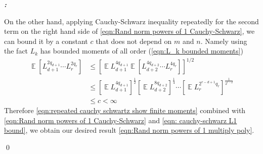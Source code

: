 \documentclass[12pt]{extarticle}
\renewenvironment{proof}[1][\proofname]{ { \it\bfseries #1: }}{\qed}
\newcommand{\1}{\field{1}}
\DeclareMathOperator{\E}{\mathbb{E}}
\numberwithin{equation}{section}
\begin{document}
\begin{proof}
\begin{enumerate}[label={(\arabic*)}]
On the other hand, applying Cauchy-Schwarz inequality repeatedly for the second term on the right hand side of \cref{eqn:Rand norm powers of 1 Cauchy-Schwarz}, we can bound it by a constant $c$ that does not depend on $m$ and $n$. Namely using the fact $L_k$ has bounded moments of all order (\cref{eqn:L_k bounded moments})
\begin{align}
    \E [L_{d+1}^{2q_{d+1}}\cdots L_r^{2q_r} ]
    & \le \left[ \E L_{d+1}^{4q_{d+1}} \E\left[ L_{d+2}^{4q_{d+2}}\cdots L_r^{4q_r}\right] \right]^{1/2} \nonumber \\
    & \le \left[\E L_{d+1}^{4q_{d+1}}\right]^{\frac{1}{2}} \left[\E L_{d+2}^{8q_{d+2}}\right]^{\frac{1}{4}} \cdots \left[\E L_r^{2^{r-d+1}q_r}\right]^{\frac{1}{2^{r-d}}} \nonumber\\
    & \le c <\infty \label{eqn:repeated cauchy schwartz show finite moments}
\end{align}
Therefore \cref{eqn:repeated cauchy schwartz show finite moments} combined with \cref{eqn:Rand norm powers of 1 Cauchy-Schwarz} and \cref{eqn: cauchy-schwarz L1 bound}, we obtain our desired result \cref{eqn:Rand norm powers of 1 multiply poly}.



\end{enumerate}
\end{proof}
\end{document}
